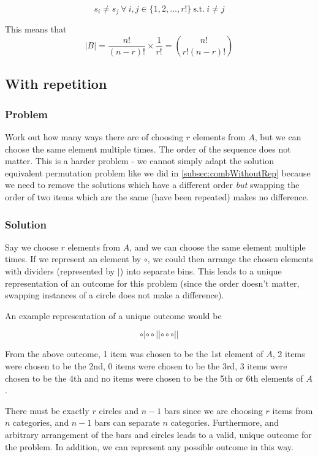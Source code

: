 \documentclass[a4paper,12pt]{article}
\begin{document}
\begin{equation}
  s_i \neq s_j\ \forall\ i, j \in \{1, 2, \ldots, r!\}\ \mbox{s.t.}\ i \neq j
\end{equation}

This means that
\begin{equation}
  |B| = \frac{n!}{(n-r)!} \times \frac{1}{r!} = \binom{n!}{r!(n-r)!}
\end{equation}

\subsection{With repetition}
\subsubsection{Problem}
Work out how many ways there are of choosing $r$ elements from $A$, but we can choose the same element multiple times. The order of the sequence does not matter. This is a harder problem - we cannot simply adapt the solution equivalent permutation problem like we did in \cref{subsec:combWithoutRep} because we need to remove the solutions which have a different order \emph{but} swapping the order of two items which are the same (have been repeated) makes no difference.

\subsubsection{Solution}
Say we choose $r$ elements from $A$, and we can choose the same element multiple times. If we represent an element by $\circ$, we could then arrange the chosen elements with dividers (represented by $|$) into separate bins. This leads to a unique representation of an outcome for this problem (since the order doesn't matter, swapping instances of a circle does not make a difference).

An example representation of a unique outcome would be

\begin{equation}
  \circ | \circ \circ | | \circ \circ \circ | |
\end{equation}

From the above outcome, 1 item was chosen to be the 1st element of $A$, 2 items were chosen to be the 2nd, 0 items were chosen to be the 3rd, 3 items were chosen to be the 4th and no items were chosen to be the 5th or 6th elements of $A$.

There must be exactly $r$ circles and $n-1$ bars since we are choosing $r$ items from $n$ categories, and $n-1$ bars can separate $n$ categories. Furthermore, and arbitrary arrangement of the bars and circles leads to a valid, unique outcome for the problem. In addition, we can represent any possible outcome in this way.
\end{document}
